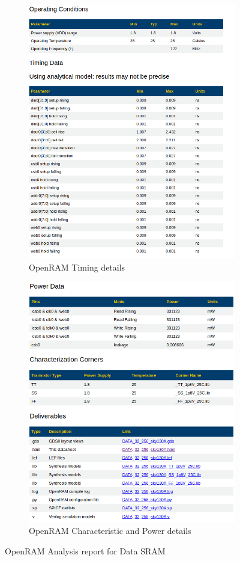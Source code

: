   \begin{figure}
    \begin{subfigure}{.5\textwidth}
      \centering
      \includegraphics[width=.8\linewidth]{./ASIC/OpenRAM_Timing.png}
      \caption{OpenRAM Timing details}
      \end{subfigure}%
      \begin{subfigure}{.5\textwidth}
      \centering
      \includegraphics[width=.8\linewidth]{./ASIC/OpenRAM_otherDescription.png}
      \caption{OpenRAM Characteristic and Power details}
      \end{subfigure}
      \caption{OpenRAM Analysis report for Data SRAM}
    \end{figure}

